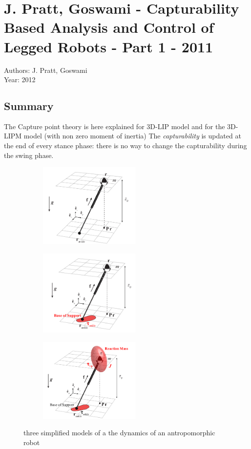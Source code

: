 \section{J. Pratt, Goswami - Capturability Based Analysis and Control of Legged Robots - Part 1 \cite{Koolen:2012:CAC:2344876.2344877} - 2011}
Authors: J. Pratt, Goswami\\
Year: 2012
\subsection*{Summary}
The Capture point theory is here explained for 3D-LIP model and for the 3D-LIPM model (with non zero moment of inertia)
The \textit{capturability} is updated at the end of every stance phase: there is no way to change the capturability during the swing phase.
\begin{figure}[h!]
\begin{subfigure}
  \centering
  \includegraphics[width=50mm]{CP.png}
  \label{PhasePlane}
\end{subfigure}
\begin{subfigure}
  \centering
  \includegraphics[width=50mm]{CPF.png}
  \label{PhasePlane}
\end{subfigure}
\begin{subfigure}
  \centering
  \includegraphics[width=50mm]{CPFM.png}
  \label{PhasePlane}
\end{subfigure}
\caption{three simplified models of a the dynamics of an antropomorphic robot}
\end{figure}
